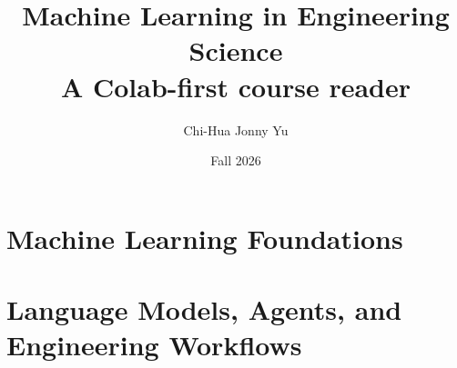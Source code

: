 \documentclass[11pt,oneside]{book}
\title{Machine Learning in Engineering Science\\\large A Colab-first course reader}
\author{Chi-Hua Jonny Yu}
\date{Fall 2026}
\begin{document}
\frontmatter
\maketitle

\tableofcontents

\mainmatter
\part{Machine Learning Foundations}








\part{Language Models, Agents, and Engineering Workflows}







\appendix



\backmatter


\end{document}
